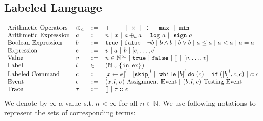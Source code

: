 \subsection{Labeled Language}
\[
\begin{array}{llll}
\mbox{Arithmetic Operators} 
& \oplus_a & ::= & + ~|~ - ~|~ \times 
%
~|~ \div ~|~ \emax ~|~ \emin
\\  
\mbox{Arithmetic Expression} 
& \aexpr & ::= & 
n ~|~ {x} ~|~ \aexpr \oplus_a \aexpr  
 ~|~ \elog \aexpr  ~|~ \esign \aexpr
\\
\mbox{Boolean Expression} & \bexpr & ::= & 
%
\etrue ~|~ \efalse  ~|~ \neg \bexpr
 ~|~ \bexpr \land \bexpr
%
~|~ \bexpr \lor \bexpr
~|~ \aexpr \leq \aexpr 
~|~ \aexpr < \aexpr 
~|~ \aexpr = \aexpr 
\\
\mbox{Expression} & \expr & ::= & v ~|~ \aexpr ~|~ \bexpr ~|~ [\expr, \dots, \expr]
\\  
%
\mbox{Value} 
& v & ::= & { n \in \mathbb{N}^{\infty} ~|~ \etrue ~|~ \efalse ~|~ [] ~|~ [v, \dots, v]} \\
%
\mbox{Label} 
& l & \in & (\mathbb{N} \cup \{\lin, \lex\}) 
\\ 
%
\mbox{Labeled Command} 
& {c} & ::= &  
\clabel{\assign{x}{\expr}}^l 
~|~  \clabel{\eskip}^l
~|~ \ewhile \clabel{\bexpr}^{l} \edo ({c})
~|~ \eif(\clabel{\bexpr}^{l} , {c}, {c}) 
~|~ {c};{c}  
\\ 
\mbox{Event} 
& \event & ::= & 
({x}, l, v) ~ \mbox{Assignment Event} 
~|~(\bexpr, l, v) ~ \mbox{Testing Event}
\\
\mbox{Trace} & \trace
& ::= & [] ~|~ \trace :: \event
\\
\end{array}
\]
We denote by $\infty$ a value s.t. $n < \infty $ for all $n \in \mathbb{N}$.
We use following notations to represent the sets of corresponding terms:
